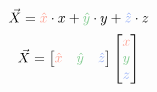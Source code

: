 \documentclass[preview]{standalone}
\begin{document}
$$\vec{X} = \textcolor[HTML]{fea294}{\hat{x}}\cdot x + \textcolor[HTML]{81cb8f}{\hat{y}}\cdot y + \textcolor[HTML]{91abf6}{\hat{z}}\cdot z$$
$$\vec{X} = \begin{bmatrix}\textcolor[HTML]{fea294}{\hat{x}}&\textcolor[HTML]{81cb8f}{\hat{y}}&\textcolor[HTML]{91abf6}{\hat{z}}\end{bmatrix}\begin{bmatrix}\textcolor[HTML]{fea294}{x}\\\textcolor[HTML]{81cb8f}{y}\\\textcolor[HTML]{91abf6}{z}\end{bmatrix}$$
\end{document}
